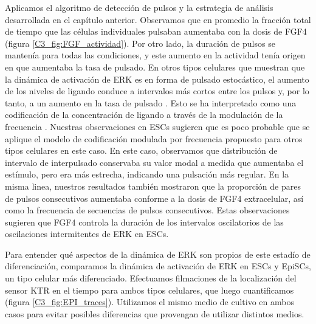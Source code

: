 \documentclass[./main.tex]{subfiles}
\begin{document}
Aplicamos el algoritmo de detección de pulsos y la estrategia de análisis desarrollada en el capítulo anterior. Observamos que en promedio la fracción total de tiempo que las células individuales pulsaban aumentaba con la dosis de FGF4 (figura \ref{C3_fig:FGF_actividad}). Por otro lado, la duración de pulsos se mantenía para todas las condiciones, y este aumento en la actividad tenía origen en que aumentaba la tasa de pulsado. En otros tipos celulares que muestran que la dinámica de activación de ERK es en forma de pulsado estocástico, el aumento de los niveles de ligando conduce a intervalos más cortos entre los pulsos y, por lo tanto, a un aumento en la tasa de pulsado \cite{Albeck2013}. Esto se ha interpretado como una codificación de la concentración de ligando a través de la modulación de la frecuencia \cite{Li2019}. Nuestras observaciones en ESCs sugieren que es poco probable que se aplique el modelo de codificación modulada por frecuencia propuesto para otros tipos celulares en este caso. En este caso, observamos que distribución de intervalo de interpulsado conservaba su valor modal a medida que aumentaba el estímulo, pero era más estrecha, indicando una pulsación más regular. En la misma linea, nuestros resultados también mostraron que la proporción de pares de pulsos consecutivos aumentaba conforme a la dosis de FGF4 extracelular, así como la frecuencia de secuencias de pulsos consecutivos. Estas observaciones sugieren que FGF4 controla la duración de los intervalos oscilatorios de las oscilaciones intermitentes de ERK en ESCs. 


Para entender qué aspectos de la dinámica de ERK son propios de este estadío de diferenciación, comparamos la dinámica de activación de ERK en ESCs y EpiSCs, un tipo celular más diferenciado. Efectuamos filmaciones de la localización del sensor KTR en el tiempo para ambos tipos celulares, que luego cuantificamos (figura \ref{C3_fig:EPI_traces}). Utilizamos el mismo medio de cultivo en ambos casos para evitar posibles diferencias que provengan de utilizar distintos medios.

\end{document}
